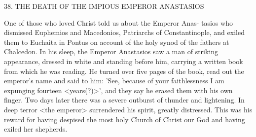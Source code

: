 38. THE DEATH OF THE IMPIOUS
EMPEROR ANASTASIOS

One of those who loved Christ told us about the Emperor Anas-
tasios who dismissed Euphemios and Macedonios, Patriarchs of
Constantinople, and exiled them to Euchaita in Pontus on account
of the holy synod of the fathers at Chalcedon. In his sleep, the
Emperor Anastasios saw a man of striking appearance, dressed in
white and standing before him, carrying a written book from which
he was reading. He turned over five pages of the book, read out the
emperor's name and said to him: 'See, because of your faithlessness
I am expunging fourteen <years(?)>', and they say he erased them
with his own finger. Two days later there was a severe outburst of
thunder and lightening. In deep terror <the emperor> surrendered
his spirit, greatly distressed. This was his reward for having despised
the most holy Church of Christ our God and having exiled her
shepherds.

